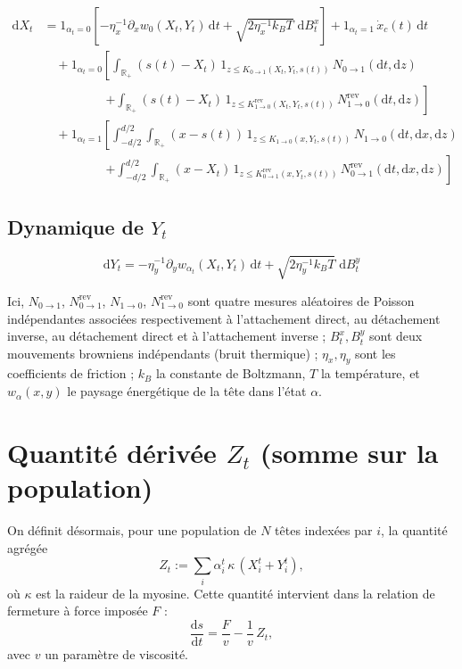 \documentclass[11pt,a4paper]{article}
\newcommand{\dd}{\mathrm{d}}
\newcommand{\R}{\mathbb{R}}
\newcommand{\indic}[1]{\mathrm{1}_{#1}}
\begin{document}
\begin{align*}
\dd X_t
&= \indic{\alpha_t=0}\left[-\eta_x^{-1}\partial_x w_0(X_t,Y_t)\,\dd t
+ \sqrt{2\eta_x^{-1}k_BT}\; \dd B_t^x\right]
+ \indic{\alpha_t=1}\, \dot x_c(t)\,\dd t \\[1mm]
&\quad + \indic{\alpha_t=0}\left[
\int_{\R_+} (s(t)-X_t)\,\indic{z \le K_{0\to1}(X_t,Y_t,s(t))}\, N_{0\to1}(\dd t,\dd z) \right.\\
&\qquad\qquad\quad \left. + \int_{\R_+} (s(t)-X_t)\,\indic{z \le K^{\mathrm{rev}}_{1\to0}(X_t,Y_t,s(t))}\, N^{\mathrm{rev}}_{1\to0}(\dd t,\dd z)
\right] \\[1mm]
&\quad + \indic{\alpha_t=1}\left[
\int_{-d/2}^{d/2}\!\!\int_{\R_+} (x-s(t))\,\indic{z \le K_{1\to0}(x,Y_t,s(t))}\, N_{1\to0}(\dd t,\dd x,\dd z) \right.\\
&\qquad\qquad\quad \left. + \int_{-d/2}^{d/2}\!\!\int_{\R_+} (x-X_t)\,\indic{z \le K^{\mathrm{rev}}_{0\to1}(x,Y_t,s(t))}\, N^{\mathrm{rev}}_{0\to1}(\dd t,\dd x,\dd z)
\right]
\end{align*}

\subsection*{Dynamique de $Y_t$}

\[
\dd Y_t = -\eta_y^{-1}\partial_y w_{\alpha_t}(X_t,Y_t)\,\dd t
+ \sqrt{2\eta_y^{-1}k_BT}\; \dd B_t^y
\]

\bigskip
\noindent
Ici, $N_{0\to1}$, $N^{\mathrm{rev}}_{0\to1}$, $N_{1\to0}$, $N^{\mathrm{rev}}_{1\to0}$
sont quatre mesures aléatoires de Poisson indépendantes associées
respectivement à l'attachement direct, au détachement inverse,
au détachement direct et à l'attachement inverse ; $B_t^x, B_t^y$
sont deux mouvements browniens indépendants (bruit thermique) ;
$\eta_x,\eta_y$ sont les coefficients de friction ; $k_B$ la constante
de Boltzmann, $T$ la température, et $w_\alpha(x,y)$ le paysage
énergétique de la tête dans l'état $\alpha$.

\section{Quantité dérivée $Z_t$ (somme sur la population)}

On définit désormais, pour une population de $N$ têtes indexées par
$i$, la quantité agrégée
\[
Z_t := \sum_i \alpha_i^t\,\kappa\,(X_i^t+Y_i^t),
\]
où $\kappa$ est la raideur de la myosine. Cette quantité intervient
dans la relation de fermeture à force imposée $F$ :
\[
\frac{\dd s}{\dd t} = \frac{F}{v} - \frac{1}{v}\,Z_t,
\]
avec $v$ un paramètre de viscosité.
\end{document}
